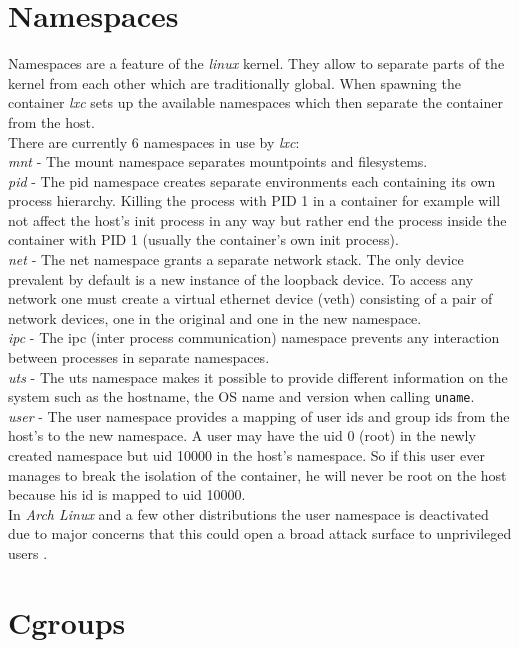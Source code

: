 \section{Namespaces}\label{ns}

Namespaces\cite{namespaces} are a feature of the \textit{linux} kernel. They allow to separate parts of the kernel from each
other which are traditionally global.
When spawning the container \textit{lxc} sets up the available namespaces which then separate the container from the host.\\
There are currently 6 namespaces in use by \textit{lxc}:\\
\textit{mnt} - The mount namespace separates mountpoints and filesystems.\\
\textit{pid} - The pid namespace creates separate environments each containing its own process hierarchy. Killing the process with PID 1
in a container for example will not affect the host's init process in any way but rather end the process inside the container with PID 1
(usually the container's own init process).\\
\textit{net} - The net namespace grants a separate network stack. The only device prevalent by default is a new instance of the loopback device.
To access any network
one must create a virtual ethernet device (veth) consisting of a pair of network devices, one in the original and one in the new namespace.\\
\textit{ipc} - The ipc (inter process communication) namespace prevents any interaction between processes in separate namespaces.\\
\textit{uts} - The uts namespace makes it possible to provide different information on the system such as the hostname, the OS name and version
when calling \texttt{uname}.\\
\textit{user} - The user namespace provides a mapping of user ids and group ids from the host's to the new namespace. A user may have the uid 0
(root) in the newly created namespace but uid 10000 in the host's namespace. So if this user ever manages to break the isolation of the
container, he will never be root on the host because his id is mapped to uid 10000.\\
In \textit{Arch Linux} and a few other distributions the user namespace is deactivated due to major concerns that this could open a broad
attack surface to unprivileged users \cite{archuserns}.

\section{Cgroups}

